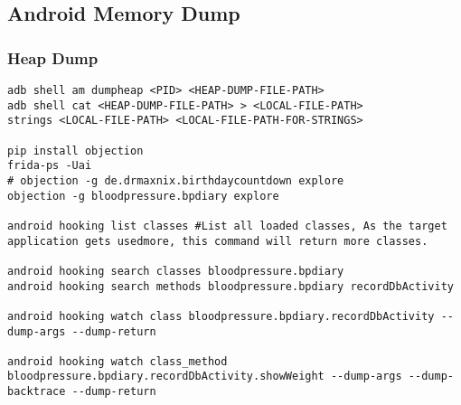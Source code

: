 \subsection{Android Memory Dump}
\label{task:20231125_memdump}

\subsubsection{Heap Dump}

\begin{lstlisting}
adb shell am dumpheap <PID> <HEAP-DUMP-FILE-PATH>  
adb shell cat <HEAP-DUMP-FILE-PATH> > <LOCAL-FILE-PATH>
strings <LOCAL-FILE-PATH> <LOCAL-FILE-PATH-FOR-STRINGS>

pip install objection
frida-ps -Uai
# objection -g de.drmaxnix.birthdaycountdown explore
objection -g bloodpressure.bpdiary explore

android hooking list classes #List all loaded classes, As the target application gets usedmore, this command will return more classes.

android hooking search classes bloodpressure.bpdiary
android hooking search methods bloodpressure.bpdiary recordDbActivity

android hooking watch class bloodpressure.bpdiary.recordDbActivity --dump-args --dump-return

android hooking watch class_method bloodpressure.bpdiary.recordDbActivity.showWeight --dump-args --dump-backtrace --dump-return
\end{lstlisting}






